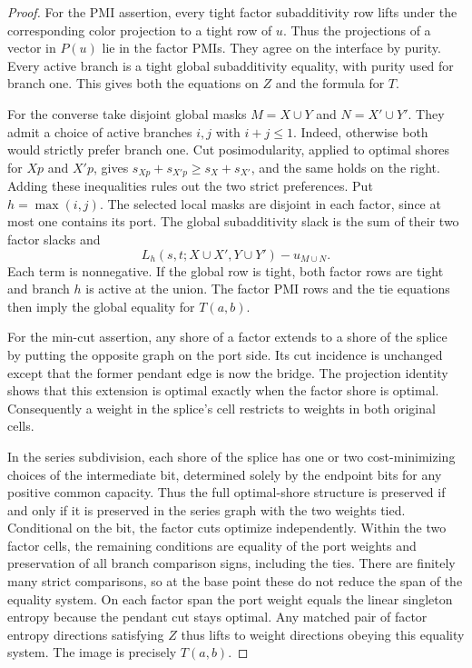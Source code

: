 \documentclass[11pt]{article}
\begin{document}
\begin{proof}
For the PMI assertion, every tight factor subadditivity row lifts
under the corresponding color projection to a tight row of \(u\).
Thus the projections of a vector in \(P(u)\) lie in the factor PMIs.
They agree on the interface by purity. Every active branch is a tight
global subadditivity equality, with purity used for branch one.
This gives both the equations on \(Z\) and the formula for \(T\).

For the converse take disjoint global masks \(M=X\cup Y\) and
\(N=X'\cup Y'\). They admit a choice of active branches \(i,j\) with
\(i+j\leq 1\). Indeed, otherwise both would strictly prefer branch one.
Cut posimodularity, applied to optimal shores for \(Xp\) and \(X'p\),
gives \(s_{Xp}+s_{X'p}\geq s_X+s_{X'}\), and the same holds on the right.
Adding these inequalities rules out the two strict preferences.
Put \(h=\max(i,j)\). The selected local masks are disjoint in each
factor, since at most one contains its port. The global subadditivity
slack is the sum of their two factor slacks and
\[
 L_h(s,t;X\cup X',Y\cup Y')-u_{M\cup N}.
\]
Each term is nonnegative. If the global row is tight, both factor rows
are tight and branch \(h\) is active at the union. The factor PMI rows
and the tie equations then imply the global equality for \(T(a,b)\).

For the min-cut assertion, any shore of a factor extends to a shore
of the splice by putting the opposite graph on the port side. Its cut
incidence is unchanged except that the former pendant edge is now the
bridge. The projection identity shows that this extension is optimal
exactly when the factor shore is optimal. Consequently a weight in the
splice's cell restricts to weights in both original cells.

In the series subdivision, each shore of the splice has one or two
cost-minimizing choices of the intermediate bit, determined solely by
the endpoint bits for any positive common capacity. Thus the full
optimal-shore structure is preserved if and only if it is preserved in
the series graph with the two weights tied. Conditional on the bit,
the factor cuts optimize independently. Within the two factor cells,
the remaining conditions are equality of the port weights and
preservation of all branch comparison signs, including the ties.
There are finitely many strict comparisons, so at the base point
these do not reduce the span of the equality system. On each factor
span the port weight equals the linear singleton entropy because the
pendant cut stays optimal. Any matched pair of factor entropy directions
satisfying \(Z\) thus lifts to weight directions obeying this equality
system. The image is precisely \(T(a,b)\).
\end{proof}
\end{document}
